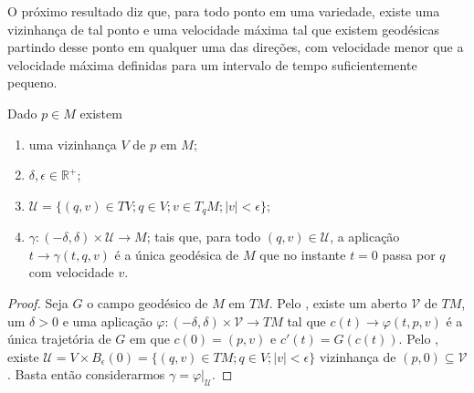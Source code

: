 O próximo resultado diz que, para todo ponto em uma variedade, existe uma vizinhança de tal ponto e uma velocidade máxima tal que existem geodésicas partindo desse ponto em qualquer uma das direções, com velocidade menor que a velocidade máxima definidas para um intervalo de tempo suficientemente pequeno.
\begin{proposition}
    \label{prop:unicidade-geodesicas}
    Dado $p \in M$ existem
    \begin{enumerate}[label=(\roman*)]
        \item uma vizinhança $V$ de $p$ em $M$;
        \item $\delta, \epsilon \in \mathbb{R}^{+}$;
        \item $\mathcal{U}=\{ (q, v)\in TV ;q \in V; v \in T_{q}M; |v|<\epsilon\}$;
        \item $\gamma:(-\delta,\delta)\times \mathcal{U}\to M$;
              tais que, para todo $(q,v)\in \mathcal{U}$, a aplicação $t \to \gamma(t,q,v)$ é a única geodésica de $M$ que no instante $t=0$ passa por $q$ com velocidade $v$.
    \end{enumerate}
    \begin{proof}

        Seja $G$ o campo geodésico de $M$ em $TM$. Pelo , existe um aberto $\mathcal{V}$ de $TM$, um $\delta>0$ e uma aplicação $\varphi:(-\delta,\delta)\times \mathcal{V}\to TM$ tal que $c(t)\to \varphi(t,p,v)$ é a única trajetória de $G$ em que $c(0)=(p,v)$ e $c'(t)=G(c(t))$. Pelo , existe $\mathcal{U}=V \times B_{\epsilon}(0)=\{ (q, v) \in TM ;q \in V; |v| < \epsilon\}$ vizinhança de $(p,0) \subseteq \mathcal{V}$.  Basta então considerarmos $\gamma=\varphi|_{\mathcal{U}}$.
    \end{proof}
\end{proposition}
